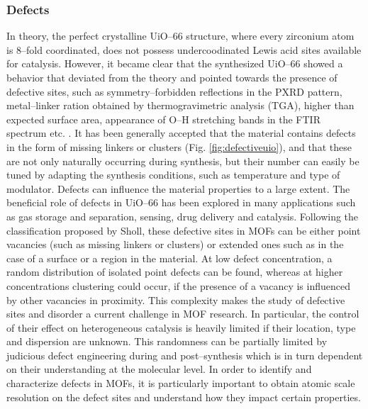 \subsubsection*{Defects}
In theory, the perfect crystalline UiO--66 structure, where every zirconium atom is 8--fold coordinated, does not possess undercoodinated Lewis acid sites available for catalysis. However, it became clear that the synthesized UiO--66 showed a behavior that deviated from the theory and pointed towards the presence of defective sites, such as symmetry--forbidden reflections in the PXRD pattern, metal--linker ration obtained by thermogravimetric analysis (TGA), higher than expected surface area, appearance of O--H stretching bands in the FTIR spectrum etc. \cite{shearer2014tuned, valenzano2011disclosing}. It has been generally accepted that the material contains defects in the form of missing linkers or clusters (Fig. \ref{fig:defectiveuio}), and that these are not only naturally occurring during synthesis, but their number can easily be tuned by adapting the synthesis conditions, such as temperature and type of modulator\cite{wu2013unusual, shearer2016defect}.
\npar
Defects can influence the material properties to a large extent. The beneficial role of defects in UiO--66 has been explored in many applications such as gas storage and separation\cite{wu2013unusual, ren2014modulated}, sensing\cite{stassen2016towards}, drug delivery\cite{cunha2013rationale} and catalysis\cite{vermoortele2013synthesis, rogge2017metal}. 
Following the classification proposed by Sholl, these defective sites in MOFs can be either point vacancies (such as missing linkers or clusters) or extended ones such as in the case of a surface \cite{sholl2015defects} or a region in the material. At low defect concentration, a random distribution of isolated point defects can be found, whereas at higher concentrations clustering could occur, if the presence of a vacancy is influenced by other vacancies in proximity. This complexity makes the study of defective sites and disorder a current challenge in MOF research. In particular, the control of their effect on heterogeneous catalysis is heavily limited if their location, type and dispersion are unknown. This randomness can be partially limited by judicious defect engineering during and post--synthesis which is in turn dependent on their understanding at the molecular level. In order to identify and characterize defects in MOFs, it is particularly important to obtain atomic scale resolution on the defect sites and understand how they impact certain properties.
